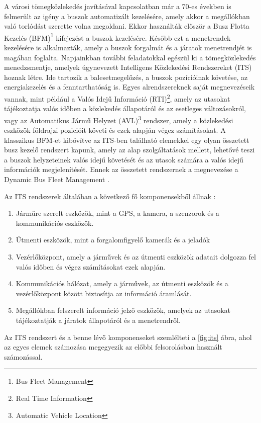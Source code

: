 A városi tömegközlekedés javításával kapcsolatban már a 70-es években is felmerült az igény a buszok automatizált kezelésére, amely akkor a megállókban való torlódást szerette volna megoldani. Ekkor használták először a Busz Flotta Kezelés (BFM)\footnote{Bus Fleet Management} kifejezést a buszok kezelésére. Később ezt a menetrendek kezelésére is alkalmazták, amely a buszok forgalmát és a járatok menetrendjét is magában foglalta. Napjainkban további feladatokkal egészül ki a tömegközlekedés menedzsmentje, amelyek úgynevezett Intelligens Közlekedési Rendszereket (ITS) hoznak létre. Ide tartozik a balesetmegelőzés, a buszok pozícióinak követése, az energiakezelés és a fenntarthatóság is. Egyes alrendszereknek saját megnevezéseik vannak, mint például a Valós Idejű Információ (RTI)\footnote{Real Time Information}, amely az utasokat tájékoztatja valós időben a közlekedés állapotáról és az esetleges változásokról, vagy az Automatikus Jármű Helyzet (AVL)\footnote{Automatic Vehicle Location} rendszer, amely a közlekedési eszközök földrajzi pozicióit követi és ezek alapján végez számításokat. A klasszikus BFM-et kibővítve az ITS-ben található elemekkel egy olyan összetett busz kezelő rendszert kapunk, amely az alap szolgáltatások mellett, lehetővé teszi a buszok helyzeteinek valós idejű követését és az utasok számára a valós idejű információk megjelenítését. Ennek az összetett rendszernek a megnevezése a Dynamic Bus Fleet Management \cite{orovsnjak2020bus,polyviou2011modelling}.

Az ITS rendszerek általában a következő fő komponensekből állnak \cite{polyviou2011modelling}:
\begin{enumerate}
  \item Járműre szerelt eszközök, mint a GPS, a kamera, a szenzorok és a kommunikációs eszközök.
  \item Útmenti eszközök, mint a forgalomfigyelő kamerák és a jeladók
  \item Vezérlőközpont, amely a járművek és az útmenti eszközök adatait dolgozza fel valós időben és végez számításokat ezek alapján.
  \item Kommunikációs hálózat, amely a járművek, az útmenti eszközök és a vezérlőközpont között biztosítja az információ áramlását.
  \item Megállókban felszerelt információ jelző eszközök, amelyek az utasokat tájékoztatják a járatok állapotáról és a menetrendről.
\end{enumerate}

Az ITS rendszert és a benne lévő komponenseket szemlélteti a \ref{fig:its} ábra, ahol az egyes elemek számozása megegyezik az előbbi felsorolásban használt számozással.

